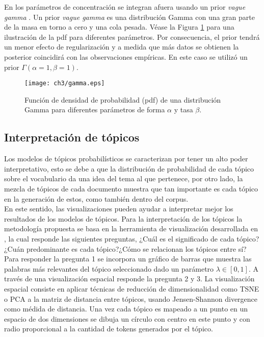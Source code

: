 En \citep{teh2005sharing} los parámetros de concentración se integran afuera usando un prior \textit{vague gamma} \citep{escobar1995bayesian}. Un prior \textit{vague gamma} es una distribución Gamma con una gran parte de la masa en torno a cero y una cola pesada. Véase la Figura \ref{img:gamma} para una ilustración de la pdf para diferentes parámetros. Por consecuencia, el prior tendrá un menor efecto de regularización y a medida que más datos se obtienen la posterior coincidirá con las observaciones empíricas. En este caso se utilizó un prior $\Gamma(\alpha=1, \beta=1)$.

\begin{figure}
    \texttt{[image: ch3/gamma.eps]}
    \caption{Función de densidad de probabilidad (pdf) de una distribución Gamma para diferentes parámetros de forma $\alpha$ y tasa $\beta$.}
    \label{img:gamma}
\end{figure}

\subsection{Interpretación de tópicos}

Los modelos de tópicos probabilísticos se caracterizan por tener un alto poder interpretativo, esto se debe a que la distribución de probabilidad de cada tópico sobre el vocabulario da una idea del tema al que pertenece, por otro lado, la mezcla de tópicos de cada documento muestra que tan importante es cada tópico en la generación de estos, como también dentro del corpus.\\

En este sentido, las visualizaciones pueden ayudar a interpretar mejor los resultados de los modelos de tópicos. Para la interpretación de los tópicos la metodología propuesta se basa en la herramienta de visualización desarrollada en  \citep{sievert2014ldavis}, la cual responde las siguientes preguntas, ¿Cuál es el significado de cada tópico?¿Cuán predominante es cada tópico?¿Cómo se relacionan los tópicos entre sí?\\

Para responder la pregunta 1 se incorpora un gráfico de barras que muestra las palabras más relevantes del tópico seleccionado dado un parámetro $\lambda \in [0,1]$. A través de una visualización espacial responde la pregunta 2 y 3. La visualización espacial consiste en aplicar técnicas de reducción de dimensionalidad como TSNE \citep{maaten2008visualizing} o PCA \citep{wold1987principal} a la matriz de distancia entre tópicos, usando Jensen-Shannon divergence \citep{endres2003new} como médida de distancia. Una vez cada tópico es mapeado a un punto en un espacio de dos dimensiones se dibuja un círculo con centro en este punto y con radio proporcional a la cantidad de tokens generados por el tópico.\\

